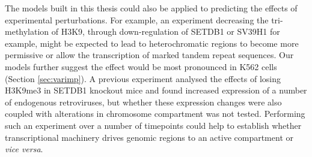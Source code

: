 \documentclass[a4paper,11pt,oneside]{book}
\begin{document}
The models built in this thesis could also be applied to predicting the effects of experimental perturbations. For example, an experiment decreasing the tri-methylation of H3K9, through down-regulation of SETDB1 or SV39H1 for example, might be expected to lead to heterochromatic regions to become more permissive or allow the transcription of marked tandem repeat sequences.\cite{Kim2012}  Our models further suggest the effect would be most pronounced in K562 cells (Section \ref{sec:varimp}). A previous experiment analysed the effects of losing H3K9me3 in SETDB1 knockout mice and found increased expression of a number of endogenous retroviruses,\cite{Karimi2011} but whether these expression changes were also coupled with alterations in chromosome compartment was not tested. Performing such an experiment over a number of timepoints could help to establish whether transcriptional machinery drives genomic regions to an active compartment or \emph{vice versa}.

%
%

\end{document}
